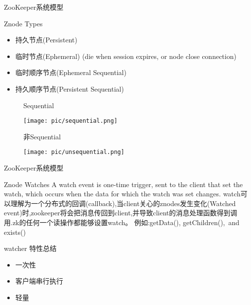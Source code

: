 \documentclass[10pt]{beamer}
\begin{document}
\begin{frame}[fragile]{ZooKeeper系统模型}
  \begin{alertblock}{Znode Types}
    \begin{itemize}
      \item 持久节点(Persistent)
      \item 临时节点(Ephemeral) (die when session expires, or node close connection)
      \item 临时顺序节点(Ephemeral Sequential)
      \item 持久顺序节点(Persistent Sequential)
    \end{itemize}
  \end{alertblock}
  \begin{figure}
    Sequential
    \begin{center}
      \texttt{[image: pic/sequential.png]}
    \end{center}
    非Sequential
    \begin{center}
      \texttt{[image: pic/unsequential.png]}
    \end{center}
  \end{figure}
\end{frame}

\begin{frame}[fragile]{ZooKeeper系统模型}
  \begin{alertblock}{Znode Watches}
    A watch event is one-time trigger, sent to the client that set the watch, which occurs when the data for which the watch was set changes.\newline \newline
    watch可以理解为一个分布式的回调(callback),当client关心的znodes发生变化(Watched event)时,zookeeper将会把消息传回到client,并导致client的消息处理函数得到调用.zk的任何一个读操作都能够设置watch。\newline
    例如:getData(), getChildren(), and  exists()
  \end{alertblock}
  watcher 特性总结
  \begin{itemize}
    \item 一次性
    \item 客户端串行执行
    \item 轻量
  \end{itemize}
\end{frame}
\end{document}
